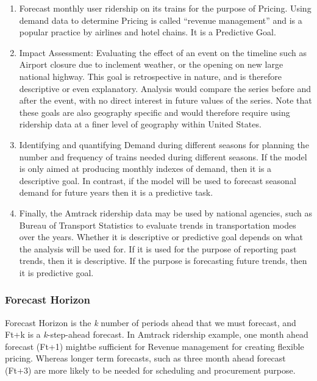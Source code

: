 \documentclass[]{article}
\begin{document}
\begin{enumerate}
\def\labelenumi{\arabic{enumi}.}
\item
  Forecast monthly user ridership on its trains for the purpose of
  Pricing. Using demand data to determine Pricing is called ``revenue
  management'' and is a popular practice by airlines and hotel chains.
  It is a Predictive Goal.
\item
  Impact Assessment: Evaluating the effect of an event on the timeline
  such as Airport closure due to inclement weather, or the opening on
  new large national highway. This goal is retrospective in nature, and
  is therefore descriptive or even explanatory. Analysis would compare
  the series before and after the event, with no direct interest in
  future values of the series. Note that these goals are also geography
  specific and would therefore require using ridership data at a finer
  level of geography within United States.
\item
  Identifying and quantifying Demand during different seasons for
  planning the number and frequency of trains needed during different
  seasons. If the model is only aimed at producing monthly indexes of
  demand, then it is a descriptive goal. In contrast, if the model will
  be used to forecast seasonal demand for future years then it is a
  predictive task.
\item
  Finally, the Amtrack ridership data may be used by national agencies,
  such as Bureau of Transport Statistics to evaluate trends in
  transportation modes over the years. Whether it is descriptive or
  predictive goal depends on what the analysis will be used for. If it
  is used for the purpose of reporting past trends, then it is
  descriptive. If the purpose is forecasting future trends, then it is
  predictive goal.
\end{enumerate}

\subsubsection{Forecast Horizon}\label{forecast-horizon}

Forecast Horizon is the \emph{k} number of periods ahead that we must
forecast, and Ft+k is a \emph{k}-step-ahead forecast. In Amtrack
ridership example, one month ahead forecast (Ft+1) mightbe sufficient
for Revenue management for creating flexible pricing. Whereas longer
term forecasts, such as three month ahead forecast (Ft+3) are more
likely to be needed for scheduling and procurement purpose.
\end{document}
